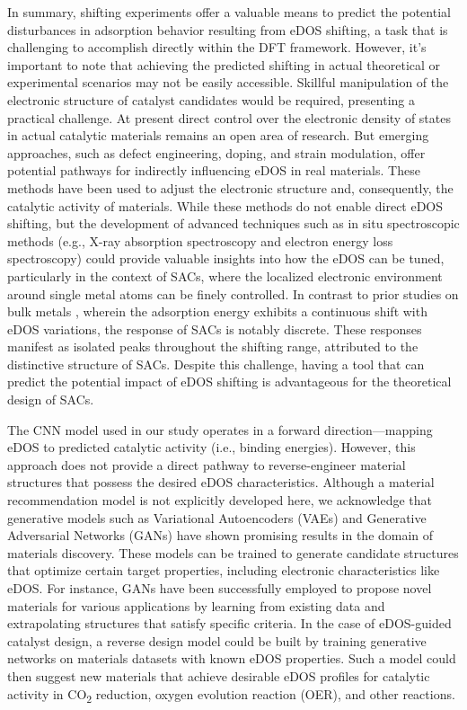     In summary, shifting experiments offer a valuable means to predict the potential disturbances in adsorption behavior resulting from eDOS shifting, a task that is challenging to accomplish directly within the DFT framework.
    However, it's important to note that achieving the predicted shifting in actual theoretical or experimental scenarios may not be easily accessible.
    Skillful manipulation of the electronic structure of catalyst candidates would be required, presenting a practical challenge.
    At present direct control over the electronic density of states in actual catalytic materials remains an open area of research.
    But emerging approaches, such as defect engineering, doping, and strain modulation, offer potential pathways for indirectly influencing eDOS in real materials.
    These methods have been used to adjust the electronic structure and, consequently, the catalytic activity of materials. While these methods do not enable direct eDOS shifting, but the development of advanced techniques such as in situ spectroscopic methods (e.g., X-ray absorption spectroscopy and electron energy loss spectroscopy) could provide valuable insights into how the eDOS can be tuned, particularly in the context of SACs, where the localized electronic environment around single metal atoms can be finely controlled.
    In contrast to prior studies on bulk metals \cite{fung2021machine}, wherein the adsorption energy exhibits a continuous shift with eDOS variations, the response of SACs is notably discrete.
    These responses manifest as isolated peaks throughout the shifting range, attributed to the distinctive structure of SACs.
    Despite this challenge, having a tool that can predict the potential impact of eDOS shifting is advantageous for the theoretical design of SACs.

    The CNN model used in our study operates in a forward direction—mapping eDOS to predicted catalytic activity (i.e., binding energies).
    However, this approach does not provide a direct pathway to reverse-engineer material structures that possess the desired eDOS characteristics.
    Although a material recommendation model is not explicitly developed here, we acknowledge that generative models such as Variational Autoencoders (VAEs) and Generative Adversarial Networks (GANs) have shown promising results in the domain of materials discovery.
    These models can be trained to generate candidate structures that optimize certain target properties, including electronic characteristics like eDOS.
    For instance, GANs have been successfully employed to propose novel materials for various applications by learning from existing data and extrapolating structures that satisfy specific criteria.
    In the case of eDOS-guided catalyst design, a reverse design model could be built by training generative networks on materials datasets with known eDOS properties.
    Such a model could then suggest new materials that achieve desirable eDOS profiles for catalytic activity in CO\textsubscript{2} reduction, oxygen evolution reaction (OER), and other reactions.


